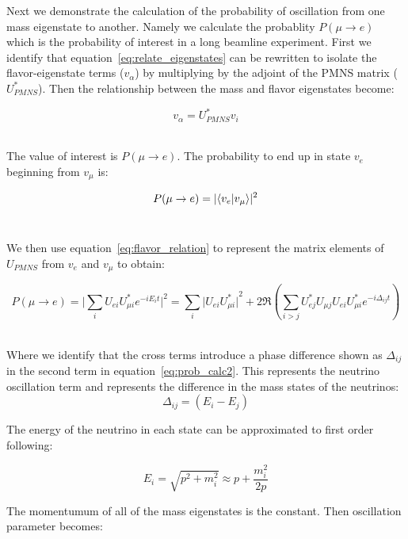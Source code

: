 Next we demonstrate the calculation of the probability of oscillation from one mass eigenstate to another.
Namely we calculate the probablity $P(\mu \rightarrow e)$ which is the probability of interest in a long beamline experiment.
First we identify that equation~\ref{eq:relate_eigenstates} can be rewritten to isolate the flavor-eigenstate terms ($v_{\alpha}$) by multiplying by the adjoint of the PMNS matrix ($U^{*}_{PMNS}$).
Then the relationship between the mass and flavor eigenstates become:

\begin{equation}
v_{\alpha} = U^{*}_{PMNS}v_{i}
\end{equation}
~\label{eq:flavor_relation}

The value of interest is $P(\mu \rightarrow e)$.
The probability to end up in state $v_{e}$ beginning from $v_{\mu}$ is:

\begin{equation}
P(\mu \rightarrow e) = \lvert \braket{ v_{e} | v_{\mu} }\rvert^{2}
\end{equation}
~\label{eq:prob_calc1}

We then use equation~\ref{eq:flavor_relation} to represent the matrix elements of $U_{PMNS}$ from $v_{e}$ and $v_{\mu}$  to obtain:

\begin{equation}
  P(\mu \rightarrow e)
  = \lvert \sum_{i} U_{e i} U^{*}_{\mu i} e^{-i E_{i}t}  \rvert^{2}
  = \sum_{i} {\lvert U_{ei}U^{*}_{\mu i} \rvert}^{2}
  +
  2 \Re( \sum_{i>j}  U^{*}_{ej}U_{\mu j}U_{ei}U^{*}_{\mu i} e^{-i \Delta_{ij}t} )
\end{equation}
~\label{eq:prob_calc2}

Where we identify that the cross terms introduce a phase difference shown as $\Delta_{ij}$ in the second term in equation~\ref{eq:prob_calc2}.
This represents the neutrino oscillation term and represents the difference in the mass states of the neutrinos:
\begin{equation}
\Delta_{ij} = (E_{i} - E_{j})
\end{equation}

The energy of the neutrino in each state can be approximated to first order following:

\begin{equation}
E_{i} = \sqrt{p^2 + m_{i}^{2}} \approx p + \frac{m^{2}_{i}}{2p}
\end{equation}

The momentumum of all of the mass eigenstates is the constant.
Then oscillation parameter becomes:

